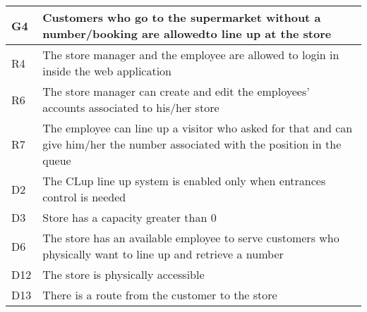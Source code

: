 \begin{center}
    {\renewcommand{\arraystretch}{1.5}
    \begin{longtable}{L{2cm}L{12cm}}
        \hline
        \textbf{G4} & \textbf{Customers who go to the supermarket without a number/booking are allowedto line up at the store} \\
        \hline
         R4 & The store manager and the employee are allowed to login in inside the web application \\
        \hline
         R6 & The store manager can create and edit the employees’ accounts associated to his/her store \\
        \hline
         R7 & The employee can line up a visitor who asked for that and can give him/her the number associated with the position in the queue \\
        \hline
         D2 & The CLup line up system is enabled only when entrances control is needed \\
        \hline
         D3 & Store has a capacity greater than 0 \\
        \hline
         D6 & The store has an available employee to serve customers who physically want to line up and retrieve a number \\
        \hline
         D12 & The store is physically accessible \\
        \hline
         D13 & There is a route from the customer to the store \\
        \hline
    \end{longtable}}


\end{center}
